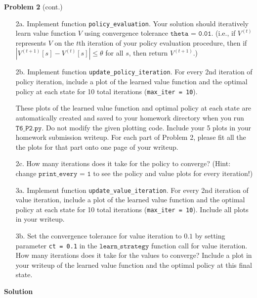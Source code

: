 \documentclass[submit]{harvardml}
\begin{document}
\begin{framed}
\textbf{Problem 2} (cont.)\\
\begin{itemize}
    \item[2a.]  Implement function \texttt{policy\_evaluation}.  Your solution should iteratively learn value function $V$ using convergence tolerance $\texttt{theta = 0.01}$.  (i.e., if $V^{(t)}$ represents $V$ on the $t$th iteration of your policy evaluation procedure, then if $|V^{(t + 1)}[s] - V^{(t)}[s]| \leq \theta$ for all $s$, then return $V^{(t + 1)}$.)
    
    \item[2b.] Implement function \texttt{update\_policy\_iteration}. For every 2nd iteration of policy iteration, include a plot of the learned value function and the optimal policy at each state for 10 total iterations (\texttt{max\_iter = 10}).  
    
    These plots of the learned value function and optimal policy at each state are automatically created and saved to your homework directory when you run $\texttt{T6\_P2.py}$.  Do not modify the given plotting code.  Include your 5 plots in your homework submission writeup.  For each part of Problem 2, please fit all the the plots for that part onto one page of your writeup.
    
    \item [2c.] How many iterations does it take for the policy to converge?  (Hint: change $\texttt{print\_every = 1}$ to see the policy and value plots for every iteration!)
       
    \item [3a.] Implement function \texttt{update\_value\_iteration}.  For every 2nd iteration of value iteration, include a plot of the learned value function and the optimal policy at each state for 10 total iterations (\texttt{max\_iter = 10}).  Include all plots in your writeup.

    \item [3b.] Set the convergence tolerance for value iteration to $0.1$ by setting parameter \texttt{ct = 0.1} in the $\texttt{learn\_strategy}$ function call for value iteration.  How many iterations does it take for the values to converge? Include a plot in your writeup of the learned value function and the optimal policy at this final state.
\end{itemize}
\end{framed}
\textbf{Solution}
\end{document}

